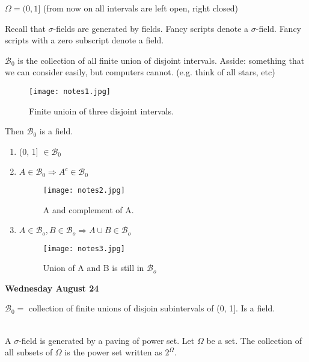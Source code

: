 \documentclass[11pt,fleqn]{book} %
\begin{document}
\begin{example}
	$\Omega = (0, 1]$ (from now on all intervals are left open, right closed)\\

	\begin{remark}
		Recall that $\sigma$-fields are generated by fields. Fancy scripts denote a $\sigma$-field. Fancy scripts with a zero subscript denote a field.
	\end{remark}

	$\mathscr{B}_0$ is the collection of all finite union of disjoint intervals. Asside: something that we can consider easily, but computers cannot. (e.g. think of all stars, etc)

	\begin{figure}[h]
	\centering\texttt{[image: notes1.jpg]}
	\caption{Finite unioin of three disjoint intervals.}
	\end{figure}

	Then $\mathscr{B}_0$ is a field. 

	\begin{enumerate}[label = (\roman*)]
		\item (0, 1] $\in \mathscr{B}_0$
		\item $A \in \mathscr{B}_0 \Rightarrow A^c \in \mathscr{B}_0$ 
		\begin{figure}[h]
		\centering\texttt{[image: notes2.jpg]}
		\caption{A and complement of A.}
		\end{figure}

		\item $A \in \mathscr{B}_o, B \in \mathscr{B}_o \Rightarrow A \cup B \in \mathscr{B}_o$ 

		\begin{figure}[h]
		\centering\texttt{[image: notes3.jpg]}
		\caption{Union of A and B is still in $\mathscr{B}_o$}
		\end{figure}

	\end{enumerate}


\end{example}


\textbf{Wednesday August 24}

$\mathscr{B}_0 = $ collection of finite unions of disjoin subintervals of (0, 1]. Is a field. \\
\\

\begin{definition}
	A $\sigma$-field is generated by a paving of power set. Let $\Omega$ be a set. The collection of all subsets of $\Omega$ is the power set written as $2^\Omega$.
\end{definition}
\end{document}
